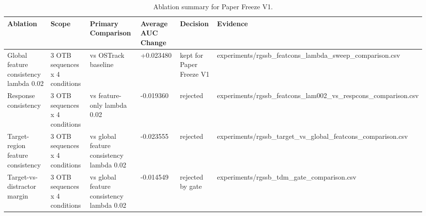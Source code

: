 \begin{table}[t]
\centering
\caption{Ablation summary for Paper Freeze V1.}
\label{tab:ablations}
\begin{tabular}{llllll}
\toprule
Ablation & Scope & Primary Comparison & Average AUC Change & Decision & Evidence \\
\midrule
Global feature consistency lambda 0.02 & 3 OTB sequences x 4 conditions & vs OSTrack baseline & +0.023480 & kept for Paper Freeze V1 & experiments/rgssb\_featcons\_lambda\_sweep\_comparison.csv \\
Response consistency & 3 OTB sequences x 4 conditions & vs feature-only lambda 0.02 & -0.019360 & rejected & experiments/rgssb\_featcons\_lam002\_vs\_respcons\_comparison.csv \\
Target-region feature consistency & 3 OTB sequences x 4 conditions & vs global feature consistency lambda 0.02 & -0.023555 & rejected & experiments/rgssb\_target\_vs\_global\_featcons\_comparison.csv \\
Target-vs-distractor margin & 3 OTB sequences x 4 conditions & vs global feature consistency lambda 0.02 & -0.014549 & rejected by gate & experiments/rgssb\_tdm\_gate\_comparison.csv \\
\bottomrule
\end{tabular}
\end{table}
